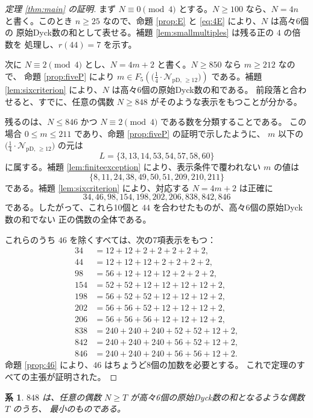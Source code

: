 \documentclass[12pt]{ltjsarticle}
\theoremstyle{plain}
\newtheorem{corollary}[theorem]{系}
\newcommand{\Pset}{\bigl(\tfrac14\cdot
  \mathcal{N}_{\mathrm{pD},\,\geq12}\bigr)}
\begin{document}
\begin{proof}[定理 \ref{thm:main} の証明]
まず $N\equiv0\pmod4$ とする。$N\geq100$ なら、$N=4n$ と書く。このとき
$n\geq25$ なので、命題 \ref{prop:E} と \eqref{eq:4E} により、$N$ は高々6個の
原始Dyck数の和として表せる。補題 \ref{lem:smallmultiples} は残る正の $4$ の倍数を
処理し、$r(44)=7$ を示す。

次に $N\equiv2\pmod4$ とし、$N=4m+2$ と書く。$N\geq850$ なら $m\geq212$ なので、
命題 \ref{prop:fiveP} により $m\in F_5(\Pset)$ である。補題
\ref{lem:sixcriterion} により、$N$ は高々6個の原始Dyck数の和である。
前段落と合わせると、すでに、任意の偶数 $N\geq848$ がそのような表示をもつことが分かる。

残るのは、$N\leq846$ かつ $N\equiv2\pmod4$ である数を分類することである。
この場合 $0\leq m\leq211$ であり、命題 \ref{prop:fiveP} の証明で示したように、
$m$ 以下の $\Pset$ の元は
\[
 L=\{3,13,14,53,54,57,58,60\}
\]
に属する。補題 \ref{lem:finiteexception} により、表示条件で覆われない $m$ の値は
\[
 \{8,11,24,38,49,50,51,209,210,211\}
\]
である。補題 \ref{lem:sixcriterion} により、対応する $N=4m+2$ は正確に
\[
 34,46,98,154,198,202,206,838,842,846
\]
である。したがって、これら10個と $44$ を合わせたものが、高々6個の原始Dyck数の和でない
正の偶数の全体である。

これらのうち $46$ を除くすべては、次の7項表示をもつ：
\[
\begin{aligned}
34&=12+12+2+2+2+2+2,\\
44&=12+12+12+2+2+2+2,\\
98&=56+12+12+12+2+2+2,\\
154&=52+52+12+12+12+12+2,\\
198&=56+52+52+12+12+12+2,\\
202&=56+56+52+12+12+12+2,\\
206&=56+56+56+12+12+12+2,\\
838&=240+240+240+52+52+12+2,\\
842&=240+240+240+56+52+12+2,\\
846&=240+240+240+56+56+12+2.
\end{aligned}
\]
命題 \ref{prop:46} により、$46$ はちょうど8個の加数を必要とする。
これで定理のすべての主張が証明された。
\end{proof}

\begin{corollary}\label{cor:threshold}
$848$ は、任意の偶数 $N\geq T$ が高々6個の原始Dyck数の和となるような偶数 $T$ のうち、
最小のものである。
\end{corollary}
\end{document}
